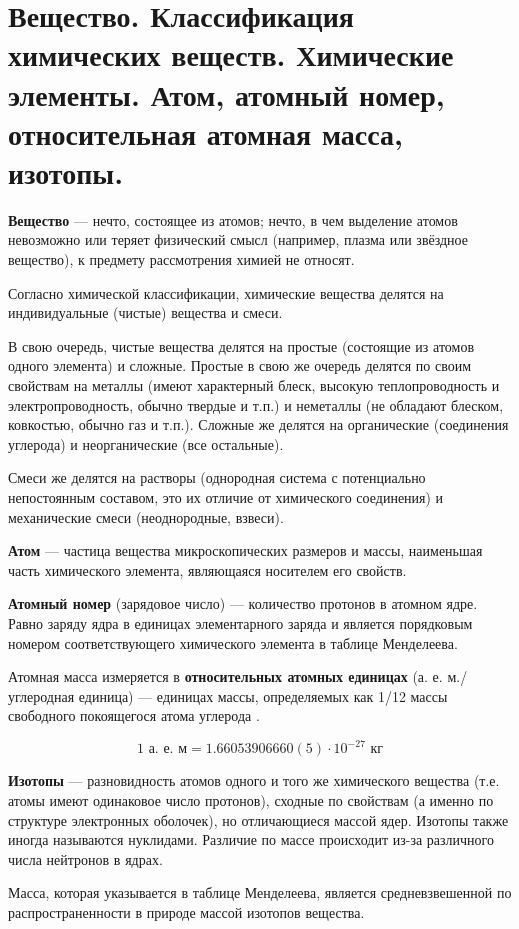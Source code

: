 \section{Вещество. Классификация химических веществ. Химические элементы. Атом, атомный номер, относительная атомная масса, изотопы.}

\textbf{Вещество} --- нечто, состоящее из атомов; нечто, в чем выделение атомов невозможно или теряет физический смысл (например, плазма или звёздное вещество), к предмету рассмотрения химией не относят.

Согласно химической классификации, химические вещества делятся на индивидуальные (чистые) вещества и смеси.

В свою очередь, чистые вещества делятся на простые (состоящие из атомов одного элемента) и сложные. Простые в свою же очередь делятся по своим свойствам на металлы (имеют характерный блеск, высокую теплопроводность и электропроводность, обычно твердые и т.п.) и неметаллы (не обладают блеском, ковкостью, обычно газ и т.п.). Сложные же делятся на органические (соединения углерода) и неорганические (все остальные).

Смеси же делятся на растворы (однородная система с потенциально непостоянным составом, это их отличие от химического соединения) и механические смеси (неоднородные, взвеси).

\textbf{Атом} --- частица вещества микроскопических размеров и массы, наименьшая часть химического элемента, являющаяся носителем его свойств.

\textbf{Атомный номер} (зарядовое число) --- количество протонов в атомном ядре. Равно заряду ядра в единицах элементарного заряда и является порядковым номером соответствующего химического элемента в таблице Менделеева.

Атомная масса измеряется в \textbf{относительных атомных единицах} (а. е. м./углеродная единица) --- единицах массы, определяемых как 1/12 массы свободного покоящегося атома углерода .

\begin{equation}
	1 \text{ а. е. м} = 1.660 539 066 60(5) \cdot 10^{-27} \text{ кг}
\end{equation}

\textbf{Изотопы} --- разновидность атомов одного и того же химического вещества (т.е. атомы имеют одинаковое число протонов), сходные по свойствам (а именно по структуре электронных оболочек), но отличающиеся массой ядер. Изотопы также иногда называются нуклидами. Различие по массе происходит из-за различного числа нейтронов в ядрах.

Масса, которая указывается в таблице Менделеева, является средневзвешенной по распространенности в природе массой изотопов вещества.


